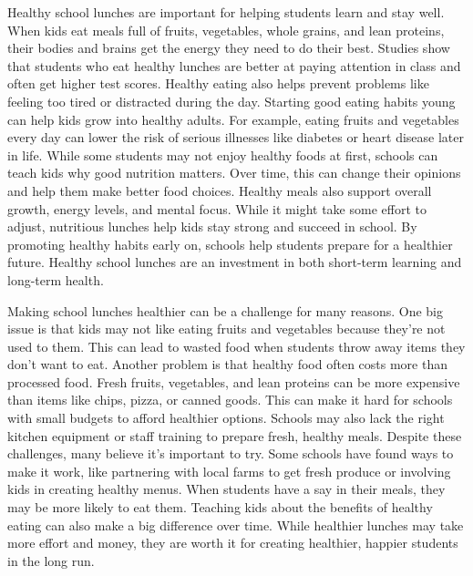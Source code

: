\documentclass[12pt]{article}
\begin{document}
\begin{tcolorbox}[colframe=black!60, colback=white, 
coltitle=black, colbacktitle=black!15, fonttitle=\bfseries\Large, 
title=Source 1: Benefits of Healthy School Lunches, halign title=center, left=10pt, right=10pt, top=10pt, bottom=15pt]
Healthy school lunches are important for helping students learn and stay well. When kids eat meals full of fruits, vegetables, whole grains, and lean proteins, their bodies and brains get the energy they need to do their best. Studies show that students who eat healthy lunches are better at paying attention in class and often get higher test scores. Healthy eating also helps prevent problems like feeling too tired or distracted during the day. Starting good eating habits young can help kids grow into healthy adults. For example, eating fruits and vegetables every day can lower the risk of serious illnesses like diabetes or heart disease later in life. While some students may not enjoy healthy foods at first, schools can teach kids why good nutrition matters. Over time, this can change their opinions and help them make better food choices. Healthy meals also support overall growth, energy levels, and mental focus. While it might take some effort to adjust, nutritious lunches help kids stay strong and succeed in school. By promoting healthy habits early on, schools help students prepare for a healthier future. Healthy school lunches are an investment in both short-term learning and long-term health.

 

 
\end{tcolorbox}

\vspace{1em}

\begin{tcolorbox}[colframe=black!60, colback=white, 
coltitle=black, colbacktitle=black!15, fonttitle=\bfseries\Large, 
title=Source 2: The Challenges of Healthy Lunches, halign title=center, left=10pt, right=10pt, top=10pt, bottom=15pt]
Making school lunches healthier can be a challenge for many reasons. One big issue is that kids may not like eating fruits and vegetables because they’re not used to them. This can lead to wasted food when students throw away items they don’t want to eat. Another problem is that healthy food often costs more than processed food. Fresh fruits, vegetables, and lean proteins can be more expensive than items like chips, pizza, or canned goods. This can make it hard for schools with small budgets to afford healthier options. Schools may also lack the right kitchen equipment or staff training to prepare fresh, healthy meals. Despite these challenges, many believe it’s important to try. Some schools have found ways to make it work, like partnering with local farms to get fresh produce or involving kids in creating healthy menus. When students have a say in their meals, they may be more likely to eat them. Teaching kids about the benefits of healthy eating can also make a big difference over time. While healthier lunches may take more effort and money, they are worth it for creating healthier, happier students in the long run. 
\end{tcolorbox}
\end{document}
